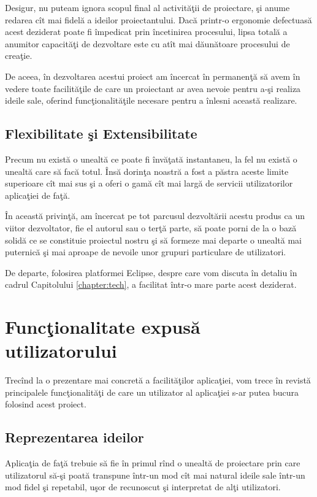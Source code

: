 Desigur, nu puteam ignora scopul final al activităţii de proiectare, şi anume
redarea cît mai fidelă a ideilor proiectantului. Dacă printr-o ergonomie
defectuasă acest deziderat poate fi împedicat prin încetinirea procesului, lipsa
totală a anumitor capacităţi de dezvoltare este cu atît mai dăunătoare
procesului de creaţie.

De aceea, în dezvoltarea acestui proiect am încercat în permanenţă să avem în
vedere toate facilităţile de care un proiectant ar avea nevoie pentru a-şi
realiza ideile sale, oferind funcţionalităţile necesare pentru a înlesni această
realizare.

\subsection{Flexibilitate şi Extensibilitate}

Precum nu există o unealtă ce poate fi învăţată instantaneu, la fel nu există o
unealtă care să facă totul. Însă dorinţa noastră a fost a păstra aceste limite
superioare cît mai sus şi a oferi o gamă cît mai largă de servicii
utilizatorilor aplicaţiei de faţă.

În această privinţă, am încercat pe tot parcusul dezvoltării acestu produs ca un
viitor dezvoltator, fie el autorul sau o terţă parte, să poate porni de la o
bază solidă ce se constituie proiectul nostru şi să formeze mai departe o
unealtă mai puternică şi mai aproape de nevoile unor grupuri particulare de
utilizatori.

De departe, folosirea platformei Eclipse, despre care vom discuta în detaliu în 
cadrul Capitolului \ref{chapter:tech}, a facilitat într-o mare parte acest 
deziderat.

\section{Funcţionalitate expusă utilizatorului}

Trecînd la o prezentare mai concretă a facilităţilor aplicaţiei, vom trece în
revistă principalele funcţionalităţi de care un utilizator al aplicaţiei s-ar
putea bucura folosind acest proiect.

\subsection{Reprezentarea ideilor}

Aplicaţia de faţă trebuie să fie în primul rînd o unealtă de proiectare prin
care utilizatorul să-şi poată transpune într-un mod cît mai natural ideile sale
într-un mod fidel şi repetabil, uşor de recunoscut şi interpretat de alţi
utilizatori.

